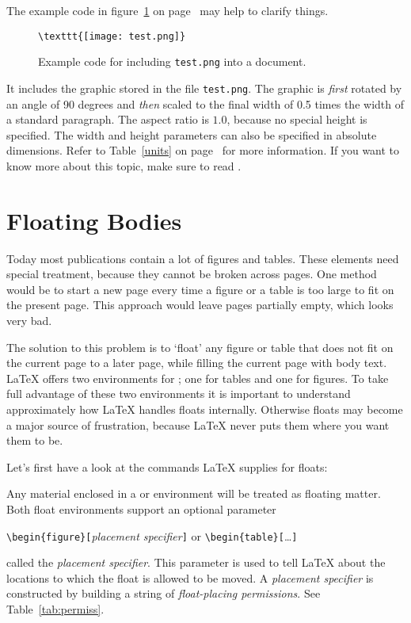 The example code in figure~\ref{figureex} on page~\pageref{figureex} may help to clarify things.
\begin{figure}
\begin{lined}{11cm}
\begin{verbatim}
\texttt{[image: test.png]}
\end{verbatim}
\end{lined}
\caption{Example code for including \texttt{test.png} into a document.\label{figureex}}
\end{figure}
It includes the graphic stored in the file \texttt{test.png}. The
graphic is \emph{first} rotated by an angle of 90 degrees and
\emph{then} scaled to the final width of 0.5 times the width of a
standard paragraph.  The aspect ratio is $1.0$, because no special
height is specified.  The width and height parameters can also be
specified in absolute dimensions. Refer to Table~\ref{units} on
page~\pageref{units} for more information. If you want to know more
about this topic, make sure to read \cite{graphics}.

\section{Floating Bodies}
Today most publications contain a lot of figures and tables. These
elements need special treatment, because they cannot be broken across
pages.  One method would be to start a new page every time a figure or
a table is too large to fit on the present page. This approach would
leave pages partially empty, which looks very bad.

The solution to this problem is to `float' any figure or table that
does not fit on the current page to a later page, while filling the
current page with body text. \LaTeX{} offers two environments for
; one for tables and  one for figures.  To
take full advantage of these two environments it is important to
understand approximately how \LaTeX{} handles floats internally.
Otherwise floats may become a major source of frustration, because
\LaTeX{} never puts them where you want them to be.

\bigskip
Let's first have a look at the commands \LaTeX{} supplies
for floats:

Any material enclosed in a  or  environment will
be treated as floating matter. Both float environments support an optional
parameter
\begin{lscommand}
\verb|\begin{figure}[|\emph{placement specifier}\verb|]| or
\verb|\begin{table}[|\ldots\verb|]|
\end{lscommand}
\noindent called the \emph{placement specifier}. This parameter
is used to tell \LaTeX{} about the locations to which the float
is allowed to be moved.  A \emph{placement specifier} is constructed by building a string
of \emph{float-placing permissions}. See Table~\ref{tab:permiss}.

